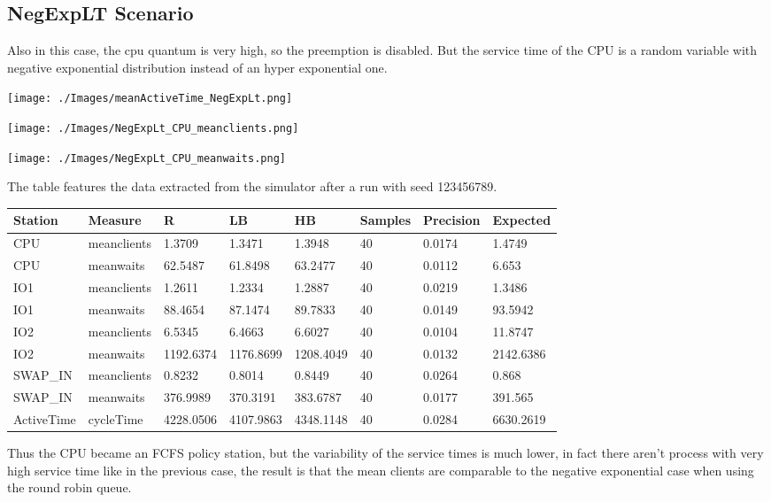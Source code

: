 \documentclass[12pt,a4paper]{article}
\begin{document}
\subsection{NegExpLT Scenario}

Also in this case, the cpu quantum is very high, so the preemption is disabled. But the service time of the CPU is a random variable with negative exponential distribution instead of an hyper exponential one.

\texttt{[image: ./Images/meanActiveTime\_NegExpLt.png]}

\texttt{[image: ./Images/NegExpLt\_CPU\_meanclients.png]}

\texttt{[image: ./Images/NegExpLt\_CPU\_meanwaits.png]}

The table features the data extracted from the simulator after a run with seed 123456789.

\begin{table}[!ht]
    \centering
    \begin{tabular}{|l|l|l|l|l|l|l|l|}
    \hline
    Station & Measure & R & LB & HB & Samples & Precision & Expected \\ \hline
    CPU & meanclients & 1.3709 & 1.3471 & 1.3948 & 40 & 0.0174 & 1.4749 \\ \hline
    CPU & meanwaits & 62.5487 & 61.8498 & 63.2477 & 40 & 0.0112 & 6.653 \\ \hline
    IO1 & meanclients & 1.2611 & 1.2334 & 1.2887 & 40 & 0.0219 & 1.3486 \\ \hline
    IO1 & meanwaits & 88.4654 & 87.1474 & 89.7833 & 40 & 0.0149 & 93.5942 \\ \hline
    IO2 & meanclients & 6.5345 & 6.4663 & 6.6027 & 40 & 0.0104 & 11.8747 \\ \hline
    IO2 & meanwaits & 1192.6374 & 1176.8699 & 1208.4049 & 40 & 0.0132 & 2142.6386 \\ \hline
    SWAP\_IN & meanclients & 0.8232 & 0.8014 & 0.8449 & 40 & 0.0264 & 0.868 \\ \hline
    SWAP\_IN & meanwaits & 376.9989 & 370.3191 & 383.6787 & 40 & 0.0177 & 391.565 \\ \hline
    ActiveTime & cycleTime & 4228.0506 & 4107.9863 & 4348.1148 & 40 & 0.0284 & 6630.2619 \\ \hline
    \end{tabular}
\end{table}

Thus the CPU became an FCFS policy station, but the variability of the service times is much lower, in fact there aren't process with very high service time like in the previous case, the result is that the mean clients are comparable to the negative exponential case when using the round robin queue. 
\end{document}

